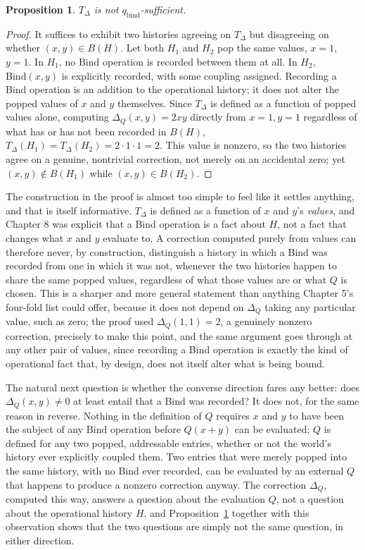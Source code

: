 \documentclass[11pt]{book}
\newtheorem{proposition}[theorem]{Proposition}
\begin{document}
\begin{proposition}
\label{prop:correction-not-witness}
$T_\Delta$ is not $q_{\mathrm{bind}}$-sufficient.
\end{proposition}
\begin{proof}
It suffices to exhibit two histories agreeing on $T_\Delta$ but disagreeing on whether $(x,y)\in B(H)$. Let both $H_1$ and $H_2$ pop the same values, $x=1$, $y=1$. In $H_1$, no $\mathrm{Bind}$ operation is recorded between them at all. In $H_2$, $\mathrm{Bind}(x,y)$ is explicitly recorded, with some coupling assigned. Recording a Bind operation is an addition to the operational history; it does not alter the popped values of $x$ and $y$ themselves. Since $T_\Delta$ is defined as a function of popped values alone, computing $\Delta_Q(x,y)=2xy$ directly from $x=1,y=1$ regardless of what has or has not been recorded in $B(H)$, $T_\Delta(H_1)=T_\Delta(H_2)=2\cdot1\cdot1=2$. This value is nonzero, so the two histories agree on a genuine, nontrivial correction, not merely on an accidental zero; yet $(x,y)\notin B(H_1)$ while $(x,y)\in B(H_2)$.
\end{proof}

The construction in the proof is almost too simple to feel like it settles anything, and that is itself informative. $T_\Delta$ is defined as a function of $x$ and $y$'s \emph{values}, and Chapter 8 was explicit that a Bind operation is a fact about $H$, not a fact that changes what $x$ and $y$ evaluate to. A correction computed purely from values can therefore never, by construction, distinguish a history in which a Bind was recorded from one in which it was not, whenever the two histories happen to share the same popped values, regardless of what those values are or what $Q$ is chosen. This is a sharper and more general statement than anything Chapter 5's four-fold list could offer, because it does not depend on $\Delta_Q$ taking any particular value, such as zero; the proof used $\Delta_Q(1,1)=2$, a genuinely nonzero correction, precisely to make this point, and the same argument goes through at any other pair of values, since recording a Bind operation is exactly the kind of operational fact that, by design, does not itself alter what is being bound.

The natural next question is whether the converse direction fares any better: does $\Delta_Q(x,y)\ne 0$ at least entail that a Bind was recorded? It does not, for the same reason in reverse. Nothing in the definition of $Q$ requires $x$ and $y$ to have been the subject of any $\mathrm{Bind}$ operation before $Q(x+y)$ can be evaluated; $Q$ is defined for any two popped, addressable entries, whether or not the world's history ever explicitly coupled them. Two entries that were merely popped into the same history, with no Bind ever recorded, can be evaluated by an external $Q$ that happens to produce a nonzero correction anyway. The correction $\Delta_Q$, computed this way, answers a question about the evaluation $Q$, not a question about the operational history $H$, and Proposition~\ref{prop:correction-not-witness} together with this observation shows that the two questions are simply not the same question, in either direction.
\end{document}
